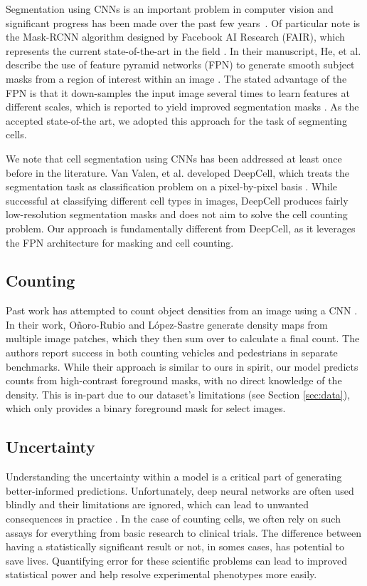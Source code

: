 \documentclass[10pt,twocolumn,letterpaper]{article}
\begin{document}
Segmentation using CNNs is an important problem in computer vision and
significant progress has been made over the past few years~\cite{deepmask, sharpmask, fastrcnn, fasterrcnn, fpn2016, maskrcnn2017}.
Of particular note is the Mask-RCNN algorithm designed by Facebook AI Research (FAIR), which represents the current state-of-the-art
in the field \cite{maskrcnn2017}. In their manuscript, He, et al. describe the use of feature pyramid networks (FPN) to generate
smooth subject masks from a region of interest within an image \cite{maskrcnn2017, fpn2016}. The stated advantage of the FPN is
that it down-samples the input image several times to learn features at different scales, which is reported to yield improved
segmentation masks \cite{fpn2016}. As the accepted state-of-the art, we adopted this approach for the task of segmenting cells.

We note that cell segmentation using CNNs has been addressed at least once before in the literature. Van Valen, et al. developed DeepCell, which treats the segmentation task as classification problem on a pixel-by-pixel basis \cite{deepcell}. While successful at classifying different cell types in images, DeepCell produces fairly low-resolution segmentation masks and does not aim to solve the cell counting problem. Our approach is fundamentally different from DeepCell, as it leverages the FPN architecture for masking and cell counting.


\subsection{Counting}
Past work has attempted to count object densities from an image using a CNN \cite{hydra}.
In their work, O\~{n}oro-Rubio and L\'{o}pez-Sastre generate density maps from multiple image
patches, which they then sum over to calculate a final count. The authors report success in both counting
vehicles and pedestrians in separate benchmarks. While their approach is similar to ours in spirit, our model
predicts counts from high-contrast foreground masks, with no direct knowledge of the density.
This is in-part due to our dataset's limitations (see Section \ref{sec:data}), which only provides a binary foreground mask for select images.


\subsection{Uncertainty}

Understanding the uncertainty within a model is a critical part of generating better-informed predictions.
Unfortunately, deep neural networks are often used blindly and their limitations are ignored,
which can lead to unwanted consequences in practice \cite{bayes_uncer_2017}. In the case of counting cells,
we often rely on such assays for everything from basic research to clinical trials. The difference between
having a statistically significant result or not, in somes cases, has potential to save lives.
Quantifying error for these scientific problems can lead to improved statistical power and help resolve
experimental phenotypes more easily.
\end{document}
